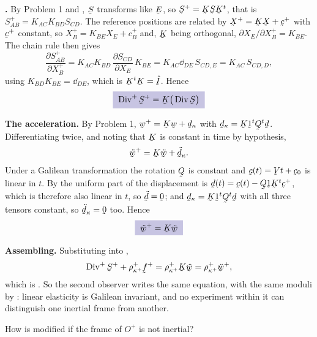 \begin{solution}
\textbf{.} By Problem 1 and , $\bS$ transforms
like $\bE$, so $\bS^{+}=\bK\bS\bK^{t}$, that is
$S^{+}_{AB}=K_{AC}K_{BD}S_{CD}$. The reference positions are related by
$\bX^{+}=\bK\bX+\bc^{+}$ with $\bc^{+}$ constant, so
$X^{+}_{B}=K_{BE}X_{E}+c^{+}_{B}$ and, $\bK$ being orthogonal,
$\partial X_{E}/\partial X^{+}_{B}=K_{BE}$. The chain rule then gives
\[
   \frac{\partial S^{+}_{AB}}{\partial X^{+}_{B}}
   =K_{AC}K_{BD}\,\frac{\partial S_{CD}}{\partial X_{E}}\,K_{BE}
   =K_{AC}\dd_{DE}\,S_{CD,E}
   =K_{AC}\,S_{CD,D},
\]
using $K_{BD}K_{BE}=\dd_{DE}$, which is $\bK^{t}\bK=\hI$. Hence
\[
   \boxed{\;\Dvg^{+}\bS^{+}=\bK\big(\Dvg\bS\big)\;}
\]

\textbf{The acceleration.} By Problem 1, $\bw^{+}=\bK\bw+\bd_{\kappa}$
with $\bd_{\kappa}=\bK\shift^{t}\bQ^{t}\bd$. Differentiating twice, and
noting that $\bK$ is constant in time by hypothesis,
\[
   \ddot\bw^{+}=\bK\ddot\bw+\ddot{\bd}_{\kappa} .
\]
Under a Galilean transformation  the rotation $\bQ$ is
constant and $\bc(t)=\bV t+\bc_{0}$ is linear in $t$. By  the
uniform part of the displacement is
$\bd(t)=\bc(t)-\bQ\shift\bK^{t}\bc^{+}$, which is therefore also linear
in $t$, so $\ddot{\bd}=\bze$; and $\bd_{\kappa}=\bK\shift^{t}\bQ^{t}\bd$
with all three tensors constant, so $\ddot{\bd}_{\kappa}=\bze$ too.
Hence
\[
   \boxed{\;\ddot\bw^{+}=\bK\ddot\bw\;}
\]

\textbf{Assembling.} Substituting into ,
\[
   \Dvg^{+}\bS^{+}+\rho^{+}_{\kappa^{+}}\bff^{+}
   =\rho^{+}_{\kappa^{+}}\bK\ddot\bw
   =\rho^{+}_{\kappa^{+}}\ddot\bw^{+},
\]
which is . So the second observer writes the same equation,
with the same moduli by : linear elasticity is Galilean
invariant, and no experiment within it can distinguish one inertial
frame from another.
\end{solution}

\begin{problem}
How is  modified if the frame of $O^{+}$ is not inertial?
\end{problem}

